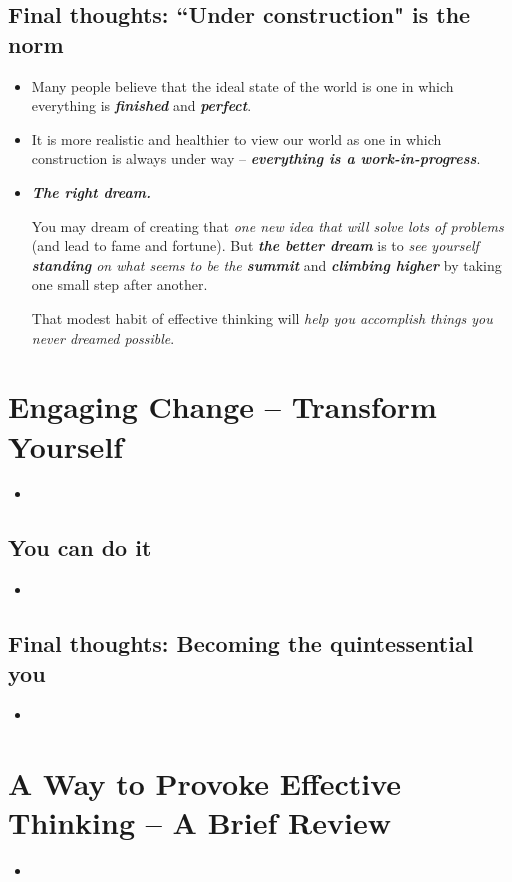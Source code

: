 \documentclass[11pt]{article}
\begin{document}
\subsection{Final thoughts: ``Under construction" is the norm}
\begin{itemize}
\item Many people believe that the ideal state of the world is one in which everything is \emph{\textbf{finished}} and \emph{\textbf{perfect}}.

\item It is more realistic and healthier to view our world as one in which construction is always under way -- \emph{\textbf{everything is a work-in-progress}}.

\item \emph{\textbf{The right dream.}}

You may dream of creating that \emph{one new idea that will solve lots of problems} (and lead to fame and fortune). But \emph{\textbf{the better dream}} is to \emph{see yourself \textbf{standing} on what seems to be the \textbf{summit}} and \emph{\textbf{climbing higher}} by taking one small step after another. 

That modest habit of effective thinking will \emph{help you accomplish things you never dreamed possible}.
\end{itemize}

\section{Engaging Change -- Transform Yourself}
\begin{itemize}
\item
\end{itemize}

\subsection{You can do it}
\begin{itemize}
\item
\end{itemize}

\subsection{Final thoughts: Becoming the quintessential you}
\begin{itemize}
\item
\end{itemize}


\section{A Way to Provoke Effective Thinking -- A Brief Review}
\begin{itemize}
\item
\end{itemize}

\newpage


\end{document}
